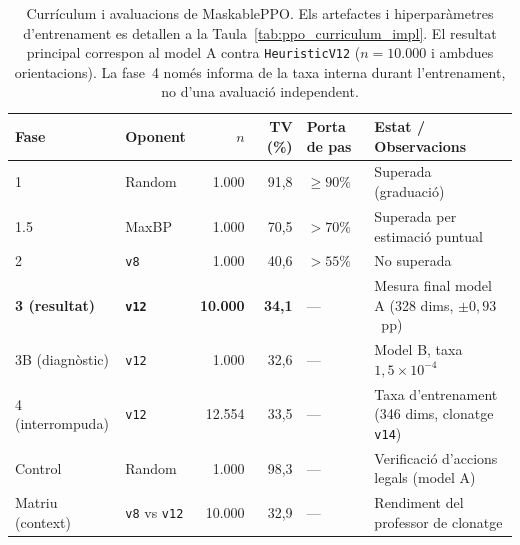 \begin{table}[htbp]
\centering
\caption{Currículum i avaluacions de MaskablePPO. Els artefactes i hiperparàmetres d'entrenament es detallen a la Taula~\ref{tab:ppo_curriculum_impl}. El resultat principal correspon al model A contra \texttt{HeuristicV12} ($n=10.000$ i ambdues orientacions). La fase~4 només informa de la taxa interna durant l'entrenament, no d'una avaluació independent.}
\label{tab:ppo_head}
\label{tab:ppo_curriculum_eval}
\small
\renewcommand{\arraystretch}{1.15}
\begin{tabularx}{\textwidth}{llrrl>{\raggedright\arraybackslash}X}
\toprule
\textbf{Fase} & \textbf{Oponent} & \textbf{$n$} & \textbf{TV (\%)} & \textbf{Porta de pas} & \textbf{Estat / Observacions} \\
\midrule
1 & Random & 1.000 & 91,8 & $\ge 90\%$ & Superada (graduació) \\
1.5 & MaxBP & 1.000 & 70,5 & $>70\%$ & Superada per estimació puntual \\
2 & \texttt{v8} & 1.000 & 40,6 & $>55\%$ & No superada \\
\textbf{3 (resultat)} & \textbf{\texttt{v12}} & \textbf{10.000} & \textbf{34,1} & --- & Mesura final model A (328 dims, $\pm 0{,}93$~pp) \\
3B (diagnòstic) & \texttt{v12} & 1.000 & 32,6 & --- & Model B, taxa $1{,}5\times10^{-4}$ \\
4 (interrompuda) & \texttt{v12} & 12.554 & 33,5 & --- & Taxa d'entrenament (346 dims, clonatge \texttt{v14}) \\
Control & Random & 1.000 & 98,3 & --- & Verificació d'accions legals (model A) \\
Matriu (context) & \texttt{v8} vs \texttt{v12} & 10.000 & 32,9 & --- & Rendiment del professor de clonatge \\
\bottomrule
\end{tabularx}
\end{table}
